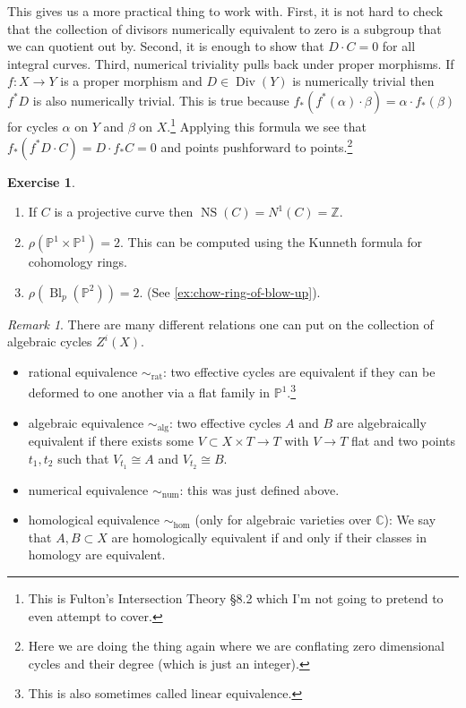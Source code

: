 \documentclass[12pt]{article}
\numberwithin{equation}{section}
\theoremstyle{definition}
\newtheorem{exercise}[theorem]{Exercise}
\theoremstyle{remark}
\newtheorem{remark}[theorem]{Remark}
\newcommand{\CC}{\mathbb{C}}
\newcommand{\ZZ}{\mathbb{Z}}
\newcommand{\PP}{\mathbb{P}}
\newcommand{\Div}{\operatorname{Div}}
\newcommand{\Bl}{\operatorname{Bl}}
\newcommand{\rat}{\operatorname{rat}}
\newcommand{\alg}{\operatorname{alg}}
\newcommand{\num}{\operatorname{num}}
\newcommand{\NS}{\operatorname{NS}}
\begin{document}
This gives us a more practical thing to work with. 
First, it is not hard to check that the collection of divisors numerically equivalent to zero is a subgroup that we can quotient out by.
Second, it is enough to show that $D\cdot C=0$ for all integral curves. 
Third, numerical triviality pulls back under proper morphisms. 
If $f:X\to Y$ is a proper morphism and $D\in \Div(Y)$ is numerically trivial then $f^*D$ is also numerically trivial.
This is true because $f_*(f^*(\alpha)\cdot \beta) = \alpha\cdot f_*(\beta)$ for cycles $\alpha$ on $Y$ and $\beta$ on $X$.\footnote{This is Fulton's Intersection Theory \S 8.2 which I'm not going to pretend to even attempt to cover.}
Applying this formula we see that $f_*(f^*D\cdot C) = D \cdot f_*C=0$ and points pushforward to points.\footnote{Here we are doing the thing again where we are conflating zero dimensional cycles and their degree (which is just an integer).}

\begin{exercise}
	\begin{enumerate}
		\item If $C$ is a projective curve then $\NS(C) = N^1(C)=\ZZ$.
		\item $\rho(\PP^1\times \PP^1)=2$. This can be computed using the Kunneth formula for cohomology rings. 
		\item $\rho(\Bl_p(\PP^2))=2$. (See \ref{ex:chow-ring-of-blow-up}).
	\end{enumerate}
\end{exercise}


\begin{remark}
	There are many different relations one can put on the collection of algebraic cycles $Z^i(X)$.
	\begin{itemize}
		\item rational equivalence $\sim_{\rat}$: two effective cycles are equivalent if they can be deformed to one another via a flat family in $\PP^1$.\footnote{This is also sometimes called linear equivalence.}  
		\item algebraic equivalence $\sim_{\alg}$: two effective cycles $A$ and $B$ are algebraically equivalent if there exists some $V \subset X\times T \to T$ with $V\to T$ flat and two points $t_1,t_2$ such that $V_{t_1}\cong A$ and $V_{t_2}\cong B$.
		\item numerical equivalence $\sim_{\num}$: this was just defined above.
		\item homological equivalence $\sim_{\hom}$ (only for algebraic varieties over $\CC$): We say that $A,B \subset X$ are homologically equivalent if and only if their classes in homology are equivalent.
	\end{itemize}
\end{remark}
\end{document}
